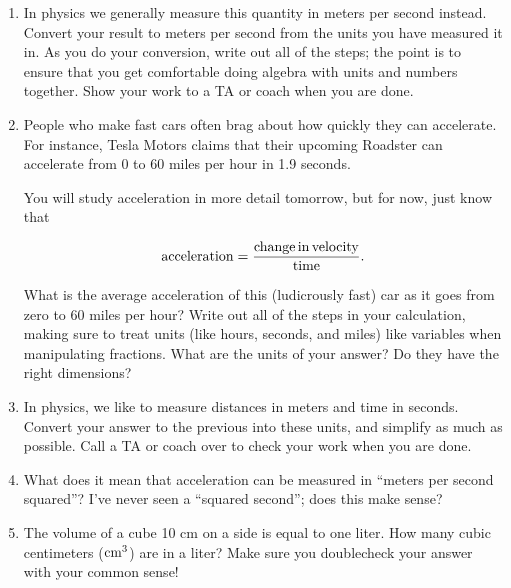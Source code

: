 \documentclass[12pt]{article}
\begin{document}
\begin{enumerate}
\item In physics we generally measure this quantity in meters per second instead. 
Convert your result to meters per second from the units you have measured it in. As you do your conversion, write out all of the 
steps; the point is to ensure that you get comfortable doing algebra with units and numbers together. Show your work to a TA
or coach when you are done.

\vspace{3in}

\newpage


\item People who make fast cars often brag about how quickly they can accelerate. For instance, Tesla Motors claims that
their upcoming Roadster can accelerate from 0 to 60 miles per hour in 1.9 seconds. 

You will study acceleration in more detail tomorrow, but for now, just know that

$$
{\rm acceleration} = \frac{\rm change\, in\, velocity}{\rm time}.
$$

What is the average acceleration of this (ludicrously fast) car as it goes from zero to 60 miles per hour? Write out all of the
steps in your calculation, making sure to treat units (like hours, seconds, and miles) like variables when manipulating fractions.
What are the units of your answer? Do they have the right dimensions?

\vspace{2in}

\item In physics, we like to measure distances in meters and time in seconds. Convert your answer to the previous into these
units, and simplify as much as possible. Call a TA or coach over to check your work when you are done.

\vspace{2in}

\item What does it mean that acceleration can be measured in ``meters per second squared''? I've never seen a ``squared second'';
does this make sense?

\vspace{1in}

\item The volume of a cube 10 cm on a side is equal to one liter. How many cubic centimeters (${\rm cm}^3$) are in a liter?
Make sure you doublecheck your answer with your common sense!

\end{enumerate}
\end{document}
